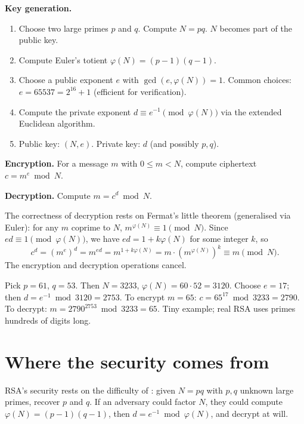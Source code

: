 \textbf{Key generation.}
\begin{enumerate}
\item Choose two large primes $p$ and $q$. Compute $N = pq$. $N$ becomes part of the public key.
\item Compute Euler's totient $\varphi(N) = (p-1)(q-1)$.
\item Choose a public exponent $e$ with $\gcd(e,\varphi(N)) = 1$. Common choices: $e = 65537 = 2^{16} + 1$ (efficient for verification).
\item Compute the private exponent $d \equiv e^{-1}\pmod{\varphi(N)}$ via the extended Euclidean algorithm.
\item Public key: $(N, e)$. Private key: $d$ (and possibly $p, q$).
\end{enumerate}

\textbf{Encryption.} For a message $m$ with $0 \leq m < N$, compute ciphertext $c = m^e \bmod N$.

\textbf{Decryption.} Compute $m = c^d \bmod N$.

The correctness of decryption rests on Fermat's little theorem (generalised via Euler): for any $m$ coprime to $N$, $m^{\varphi(N)} \equiv 1 \pmod{N}$. Since $ed \equiv 1 \pmod{\varphi(N)}$, we have $ed = 1 + k\varphi(N)$ for some integer $k$, so
\[
  c^d = (m^e)^d = m^{ed} = m^{1+k\varphi(N)} = m\cdot(m^{\varphi(N)})^k \equiv m \pmod{N}.
\]
The encryption and decryption operations cancel.

\begin{example}
Pick $p=61$, $q=53$. Then $N = 3233$, $\varphi(N) = 60\cdot 52 = 3120$. Choose $e = 17$; then $d = e^{-1} \bmod 3120 = 2753$. To encrypt $m = 65$: $c = 65^{17} \bmod 3233 = 2790$. To decrypt: $m = 2790^{2753} \bmod 3233 = 65$. Tiny example; real RSA uses primes hundreds of digits long.
\end{example}

\section{Where the security comes from}

RSA's security rests on the difficulty of : given $N = pq$ with $p,q$ unknown large primes, recover $p$ and $q$. If an adversary could factor $N$, they could compute $\varphi(N) = (p-1)(q-1)$, then $d = e^{-1} \bmod \varphi(N)$, and decrypt at will.

